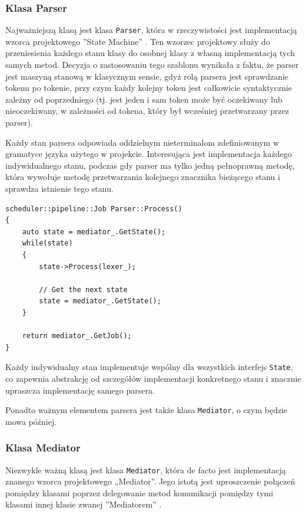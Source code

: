 \subsubsection{Klasa Parser}

Najważniejszą klasą jest klasa \texttt{Parser}, która w rzeczywistości jest implementacją wzorca projektowego ''State Machine'' \cite{state}. Ten wzorzec projektowy służy do przeniesienia każdego stanu klasy do osobnej klasy z własną implementacją tych samych metod. Decyzja o zastosowaniu tego szablonu wynikała z faktu, że parser jest maszyną stanową w klasycznym sensie, gdyż rolą parsera jest sprawdzanie tokenu po tokenie, przy czym każdy kolejny token jest całkowicie syntaktycznie zależny od poprzedniego (tj. jest jeden i sam token może być oczekiwany lub nieoczekiwany, w zależności od tokena, który był wcześniej przetwarzany przez parser).

Każdy stan parsera odpowiada oddzielnym nieterminalom zdefiniowanym w gramatyce języka użytego w projekcie. Interesująca jest implementacja każdego indywidualnego stanu, podczas gdy parser ma tylko jedną pełnoprawną metodę, która wywołuje metodę przetwarzania kolejnego znacznika bieżącego stanu i sprawdza istnienie tego stanu.


\begin{lstlisting}[label=list:parser,caption=Metoda Parser::Process(),basicstyle=\footnotesize\ttfamily]
scheduler::pipeline::Job Parser::Process()
{
    auto state = mediator_.GetState();
    while(state)
    {
        state->Process(lexer_);
    
        // Get the next state
        state = mediator_.GetState();
    }
    
    return mediator_.GetJob();
}
\end{lstlisting}

Każdy indywidualny stan implementuje wspólny dla wszystkich interfejs \texttt{State}, co zapewnia abstrakcję od szczegółów implementacji konkretnego stanu i znacznie upraszcza implementację samego parsera.

Ponadto ważnym elementem parsera jest także klasa \texttt{Mediator}, o czym będzie mowa później.

\subsubsection{Klasa Mediator}

Niezwykle ważną klasą jest klasa \texttt{Mediator}, która de facto jest implementacją znanego wzorca projektowego „Mediator”. Jego istotą jest uproszczenie połączeń pomiędzy klasami poprzez delegowanie metod komunikacji pomiędzy tymi klasami innej klasie zwanej ''Mediatorem'' \cite{mediator}.

